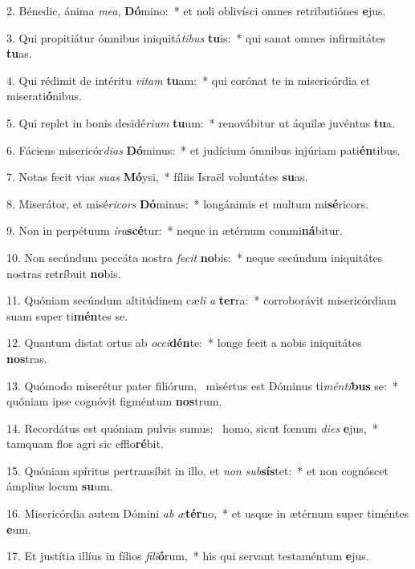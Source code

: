 2. Bénedic, ánima \textit{me}\textit{a}, \textbf{Dó}mino:~*  et noli oblivísci omnes retributiónes \textbf{e}jus.\

3. Qui propitiátur ómnibus iniquitá\textit{ti}\textit{bus} \textbf{tu}is:~*  qui sanat omnes infirmitátes \textbf{tu}as.\

4. Qui rédimit de intéritu \textit{vi}\textit{tam} \textbf{tu}am:~*  qui corónat te in misericórdia et miserati\textbf{ó}nibus.\

5. Qui replet in bonis desidé\textit{ri}\textit{um} \textbf{tu}um:~*  renovábitur ut áquilæ juvéntus \textbf{tu}a.\

6. Fáciens misericór\textit{di}\textit{as} \textbf{Dó}minus:~*  et judícium ómnibus injúriam pati\textbf{én}tibus.\

7. Notas fecit vias \textit{su}\textit{as} \textbf{Mó}ysi,~*  fíliis Israël voluntátes \textbf{su}as.\

8. Miserátor, et misé\textit{ri}\textit{cors} \textbf{Dó}minus:~*  longánimis et multum mi\textbf{sé}ricors.\

9. Non in perpétuum \textit{i}\textit{ra}\textbf{scé}tur:~*  neque in ætérnum commi\textbf{ná}bitur.\

10. Non secúndum peccáta nostra \textit{fe}\textit{cit} \textbf{no}bis:~*  neque secúndum iniquitátes nostras retríbuit \textbf{no}bis.\

11. Quóniam secúndum altitúdinem cæ\textit{li} \textit{a} \textbf{ter}ra:~*  corroborávit misericórdiam suam super ti\textbf{mén}tes se.\

12. Quantum distat ortus ab \textit{oc}\textit{ci}\textbf{dén}te:~*  longe fecit a nobis iniquitátes \textbf{nos}tras.\

13. Quómodo miserétur pater filiórum, \dag\  misértus est Dóminus ti\textit{mén}\textit{ti}\textbf{bus} se:~*  quóniam ipse cognóvit figméntum \textbf{nos}trum.\

14. Recordátus est quóniam pulvis sumus: \dag\  homo, sicut fœnum \textit{di}\textit{es} \textbf{e}jus,~*  tamquam flos agri sic efflo\textbf{ré}bit.\

15. Quóniam spíritus pertransíbit in illo, et \textit{non} \textit{sub}\textbf{sís}tet:~*  et non cognóscet ámplius locum \textbf{su}um.\

16. Misericórdia autem Dómini \textit{ab} \textit{æ}\textbf{tér}no,~*  et usque in ætérnum super timéntes \textbf{e}um.\

17. Et justítia illíus in fílios \textit{fi}\textit{li}\textbf{ó}rum,~*  his qui servant testaméntum \textbf{e}jus.\

